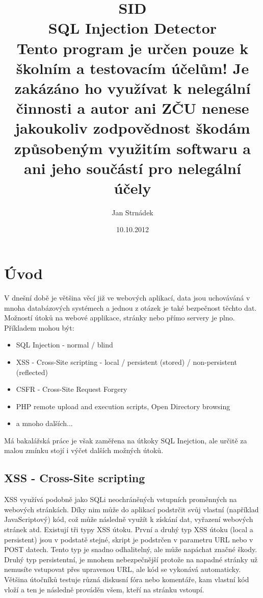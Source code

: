 \documentclass[12pt, a4paper]{report}
\begin{document}
\author{Jan Strnádek}
\date{10.10.2012}
\title{SID\\\small{SQL Injection Detector\\Tento program je určen pouze k školním a testovacím účelům! Je zakázáno ho využívat k nelegální činnosti a autor ani ZČU nenese jakoukoliv zodpovědnost škodám způsobeným využitím softwaru a ani jeho součástí pro nelegální účely}}
\begin{titlepage}
\maketitle
\end{titlepage}
\tableofcontents
\chapter{Úvod}
V dnešní době je většina věcí již ve webových aplikací, data jsou uchováváná v mnoha databázových systémech a jednou z otázek je také bezpečnost těchto dat. Možností útoků na webové applikace, stránky nebo přímo servery je plno. Příkladem mohou být:
\begin{itemize}
\item SQL Injection - normal / blind
\item XSS - Cross-Site scripting - local / persistent (stored) / non-persistent (reflected)
\item CSFR - Cross-Site Request Forgery 
\item PHP remote upload and execution scripts, Open Directory browsing
\item a mnoho dalších...
\end{itemize}
Má bakalářská práce je však zaměřena na útkoky SQL Inejction, ale určitě za malou zmínku stojí i výčet dalších možných útoků.
\section{XSS - Cross-Site scripting}
XSS využívá podobně jako SQLi neochráněných vstupních proměnných na webových stránkách. Díky nim může do aplikací podstrčit svůj vlastní (například JavaScriptový) kód, což může následně využít k získání dat, vyřazení webových stránek atd. Existují tři typy XSS útoku. První a druhý typ XSS útoku (local a persistent) jsou v podstatě stejné, skript je podstrčen v parametru URL nebo v POST datech. Tento typ je snadno odhalitelný, ale může napáchat značné škody. Druhý typ persistentní, je mnohem nebezpečnější protože na napadné stránky už nemusíte vstupovat přes upravenou URL, ale kód se vykonává automaticky. Většina útočníků testuje různá diskusní fóra nebo komentáře, kam vlastní kód vloží a ten je následně prováděn všem, kteří na stránku vstoupí.
\end{document}
